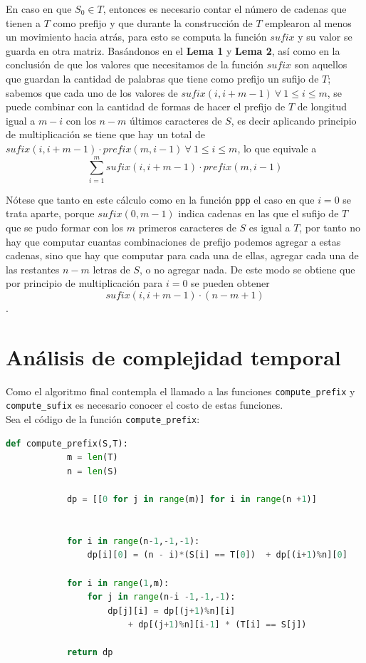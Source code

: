 \documentclass[a4paper]{article}
\begin{document}
     En caso en que $S_0 \in T$, entonces es necesario contar el n\'umero de cadenas que tienen a $T$ como prefijo y que durante la 
     construcci\'on de $T$ emplearon al menos un movimiento hacia atr\'as, para esto se computa la funci\'on $sufix$ y su valor se 
     guarda en otra matriz. Bas\'andonos en el \textbf{Lema 1} y \textbf{Lema 2}, as\'i como en la conclusi\'on de que los 
     valores que necesitamos de la funci\'on $sufix$ son aquellos que guardan la cantidad de palabras que tiene como prefijo un sufijo de $T$; 
     sabemos que cada uno de los valores de $sufix(i, i+m-1) ~ \forall~ 1 \leq i \leq m$, se puede combinar con la cantidad de formas de hacer 
     el prefijo de $T$ de longitud igual a $m -i$ con los $n-m$ \'ultimos caracteres de $S$, es decir aplicando principio de multiplicaci\'on 
     se tiene que hay un total de $sufix(i, i+m-1) \cdot prefix(m,i-1)  ~ \forall~ 1 \leq i \leq m $, lo que equivale a 
     $$\sum_{i=1}^{m} sufix(i, i+m-1) \cdot prefix(m,i-1) $$ 

     N\'otese que tanto en este c\'alculo como en la funci\'on \texttt{ppp} el caso en que $i = 0$ se trata aparte, porque $sufix(0, m-1)$
    indica cadenas en las que el sufijo de $T$ que se pudo formar con los $m$ primeros caracteres de $S$ es igual a $T$, por tanto no hay que 
    computar cuantas combinaciones de prefijo podemos agregar a estas cadenas, sino que hay que computar para cada una de ellas, agregar cada una de las restantes 
    $n - m$ letras de $S$, o no agregar nada. De este modo se obtiene que por principio de multiplicaci\'on para $i = 0$ se pueden obtener 
    $$sufix(i, i+m-1) \cdot (n - m + 1)$$.
    
    
    \section*{An\'alisis de complejidad temporal}

    Como el algoritmo final contempla el llamado a las funciones \texttt{compute\_prefix} y \texttt{compute\_sufix}
    es necesario conocer el costo de estas funciones.\\ 

    Sea el c\'odigo de la funci\'on \texttt{compute\_prefix}: 

    \begin{lstlisting}[language=Python]
        def compute_prefix(S,T):
            m = len(T)
            n = len(S)

            dp = [[0 for j in range(m)] for i in range(n +1)]

    
            for i in range(n-1,-1,-1):
                dp[i][0] = (n - i)*(S[i] == T[0])  + dp[(i+1)%n][0] 

            for i in range(1,m):
                for j in range(n-i -1,-1,-1):
                    dp[j][i] = dp[(j+1)%n][i] 
                        + dp[(j+1)%n][i-1] * (T[i] == S[j])

            return dp
    \end{lstlisting}
\end{document}
